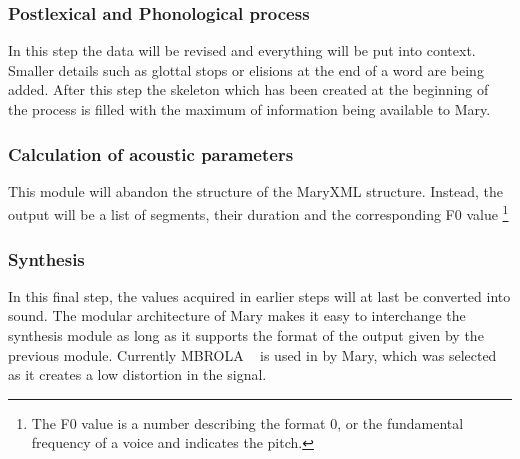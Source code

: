 \documentclass[a4paper, 12pt]{article}
\begin{document}
\subsubsection*{Postlexical and Phonological process}

In this step the data will be revised and everything will be put into context.
Smaller details such as glottal stops or elisions at the end of a word are being added.
After this step the skeleton which has been created at the beginning of the process is filled with the maximum of information being available to Mary.

\subsubsection*{Calculation of acoustic parameters}

This module will abandon the structure of the MaryXML structure.
Instead, the output will be a list of segments, their duration and the corresponding F0 value \footnote {The F0 value is a number describing the format 0, or the fundamental frequency of a voice and indicates the pitch.}

\subsubsection*{Synthesis}
In this final step, the values acquired in earlier steps will at last be converted into sound.
The modular architecture of Mary makes it easy to interchange the synthesis module as long as it supports the format of the output given by the previous module.
Currently MBROLA ~\cite{dutoit1996mbrola} is used in by Mary, which was selected as it creates a low distortion in the signal.

\newpage
\end{document}
